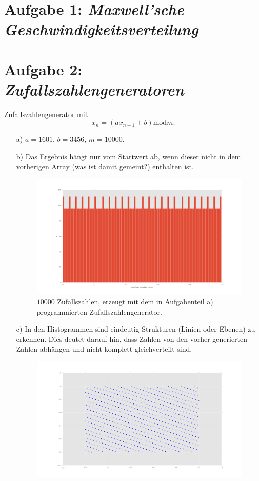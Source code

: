 
\section*{Aufgabe 1: \emph{Maxwell'sche Geschwindigkeitsverteilung}}


\section*{Aufgabe 2: \emph{Zufallszahlengeneratoren}}

Zufallszahlengenerator mit
\begin{equation}
x_n=(ax_{n-1}+b) \text{mod}m.
\end{equation}

\begin{itemize}


\item[a)] $a=1601$, $b=3456$, $m=10000$.
\item[b)] Das Ergebnis hängt nur vom Startwert ab, wenn dieser nicht in dem vorherigen Array (was ist damit gemeint?) enthalten ist.
\begin{figure}
\centering
\includegraphics[width=\textwidth]{linear_kongruent_random_numbers.png}
\caption{$10000$ Zufallszahlen, erzeugt mit dem in Aufgabenteil a) programmierten Zufallszahlengenerator.}
\label{fig:2b}
\end{figure}
\item[c)] In den Histogrammen sind eindeutig Strukturen (Linien oder Ebenen) zu erkennen. Dies deutet darauf hin, dass Zahlen von den vorher generierten Zahlen abhängen und nicht komplett gleichverteilt sind.
\begin{figure}
\centering
\includegraphics[width=\textwidth]{2dscatter.png}

\end{figure}
\end{itemize}
